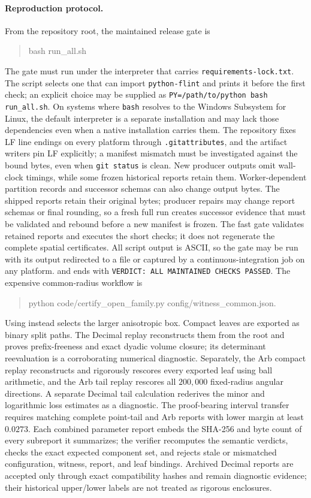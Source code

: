\documentclass[11pt,twoside,leqno]{article}
\theoremstyle{plain}
\theoremstyle{definition}
\theoremstyle{remark}
\begin{document}
\paragraph{Reproduction protocol.} From the repository root, the maintained
release gate is
\begin{quote}\ttfamily bash run\_all.sh
\end{quote}
The gate must run under the interpreter that carries \texttt{requirements-lock.txt}.  The script selects one that can import \texttt{python-flint} and prints it before the first check; an explicit choice may be supplied as \texttt{PY=/path/to/python bash run\_all.sh}.  On systems where \texttt{bash} resolves to the Windows Subsystem for Linux, the default interpreter is a separate installation and may lack those dependencies even when a native installation carries them.  The repository fixes LF line endings on every platform through \texttt{.gitattributes}, and the artifact writers pin LF explicitly; a manifest mismatch must be investigated against the bound bytes, even when \texttt{git status} is clean. New producer outputs omit wall-clock timings, while some frozen historical reports retain them. Worker-dependent partition records and successor schemas can also change output bytes. The shipped reports retain their original bytes; producer repairs may change report schemas or final rounding, so a fresh full run creates successor evidence that must be validated and rebound before a new manifest is frozen. The fast gate validates retained reports and executes the short checks; it does not regenerate the complete spatial certificates.  All script output is ASCII, so the gate may be run with its output redirected to a file or captured by a continuous-integration job on any platform.
and ends with \texttt{VERDICT: ALL MAINTAINED CHECKS PASSED}. The expensive
common-radius workflow is
\begin{quote}\ttfamily python code/certify\_open\_family.py config/witness\_common.json.
\end{quote}
Using  instead selects the larger
anisotropic box. Compact leaves are exported as binary split paths.
The Decimal replay reconstructs them from the root and proves prefix-freeness
and exact dyadic volume closure; its determinant reevaluation is a
corroborating numerical diagnostic. Separately, the Arb compact replay
reconstructs and rigorously rescores every exported leaf using ball arithmetic,
and the Arb tail replay rescores all $200{,}000$ fixed-radius angular directions.
A separate Decimal tail calculation rederives the minor and logarithmic loss estimates as a diagnostic. The proof-bearing interval transfer requires matching complete point-tail and Arb reports with lower margin at least $0.0273$. Each combined parameter report
embeds the SHA-256 and byte count of every subreport it summarizes; the verifier
recomputes the semantic verdicts, checks the exact expected component set, and
rejects stale or mismatched configuration, witness, report, and leaf bindings. Archived Decimal reports are accepted only through exact compatibility hashes and remain diagnostic evidence; their historical upper/lower labels are not treated as rigorous enclosures.
\end{document}
